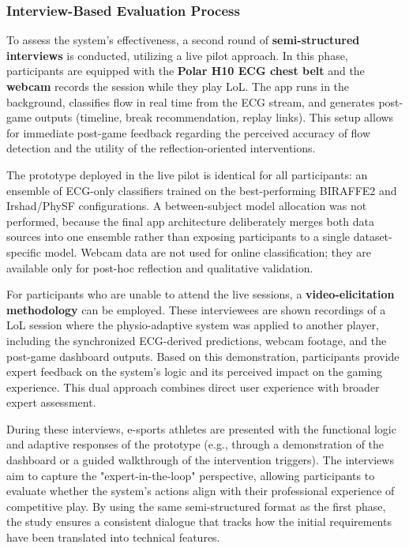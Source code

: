 \subsubsection{Interview-Based Evaluation Process}
To assess the system's effectiveness, a second round of \textbf{semi-structured interviews} is conducted, utilizing a live pilot approach. In this phase, participants are equipped with the \textbf{Polar H10 ECG chest belt} and the \textbf{webcam} records the session while they play LoL. The app runs in the background, classifies flow in real time from the ECG stream, and generates post-game outputs (timeline, break recommendation, replay links). This setup allows for immediate post-game feedback regarding the perceived accuracy of flow detection and the utility of the reflection-oriented interventions.

The prototype deployed in the live pilot is identical for all participants: an ensemble of ECG-only classifiers trained on the best-performing BIRAFFE2 and Irshad/PhySF configurations. A between-subject model allocation was not performed, because the final app architecture deliberately merges both data sources into one ensemble rather than exposing participants to a single dataset-specific model. Webcam data are not used for online classification; they are available only for post-hoc reflection and qualitative validation.

For participants who are unable to attend the live sessions, a \textbf{video-elicitation methodology} can be employed. These interviewees are shown recordings of a LoL session where the physio-adaptive system was applied to another player, including the synchronized ECG-derived predictions, webcam footage, and the post-game dashboard outputs. Based on this demonstration, participants provide expert feedback on the system's logic and its perceived impact on the gaming experience. This dual approach combines direct user experience with broader expert assessment.

During these interviews, e-sports athletes are presented with the functional logic and adaptive responses of the prototype (e.g., through a demonstration of the dashboard or a guided walkthrough of the intervention triggers). The interviews aim to capture the "expert-in-the-loop" perspective, allowing participants to evaluate whether the system's actions align with their professional experience of competitive play. By using the same semi-structured format as the first phase, the study ensures a consistent dialogue that tracks how the initial requirements have been translated into technical features.

